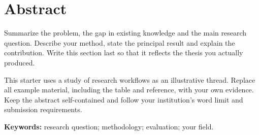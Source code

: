 \chapter*{Abstract}
Summarize the problem, the gap in existing knowledge and the main research
question. Describe your method, state the principal result and explain the
contribution. Write this section last so that it reflects the thesis you
actually produced.

This starter uses a study of research workflows as an illustrative thread.
Replace all example material, including the table and reference, with your
own evidence. Keep the abstract self-contained and follow your institution's
word limit and submission requirements.

\textbf{Keywords:} research question; methodology; evaluation; your field.
\vspace{12mm}
